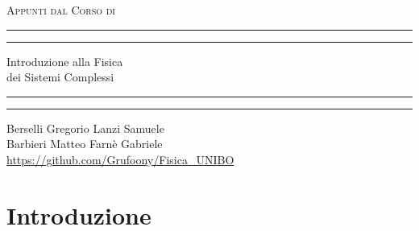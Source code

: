 \documentclass[12pt, a4paper]{book}
\theoremstyle{theorem}
\begin{document}
	\begin{titlepage}
		\centering %
		\scshape %
		Appunti dal Corso di
		\vspace*{1.5\baselineskip} %
		
		
		
		\rule{13cm}{1.6pt}\vspace*{-\baselineskip}\vspace*{2pt} %
		\rule{13cm}{0.4pt} %
		
		\vspace{0.75\baselineskip} %
		{ \Huge Introduzione alla Fisica\\
		\vspace{4mm}
		dei Sistemi Complessi \\ }
		\vspace{0.75\baselineskip} %
		\rule{13cm}{0.4pt}\vspace*{-\baselineskip}\vspace{3.2pt} %
		\rule{13cm}{1.6pt} %
		
		\vspace{1.75\baselineskip} %
		{}
		Berselli Gregorio \quad Lanzi Samuele\\
		Barbieri Matteo \quad Farnè Gabriele\\
		\url{https://github.com/Grufoony/Fisica_UNIBO}
		\vfill
	\end{titlepage}
	\tableofcontents
	\chapter{Introduzione} %
\end{document}
